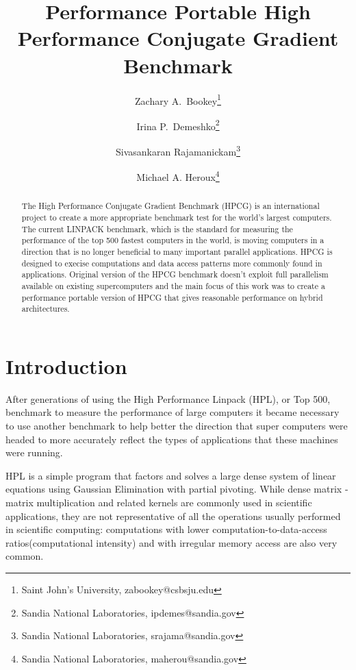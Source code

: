 \documentclass{ccr15}
\title{Performance Portable High Performance Conjugate Gradient Benchmark}
\author{Zachary A.\ Bookey\thanks{Saint John's University, zabookey@csbsju.edu} \and Irina P.\ Demeshko\thanks{Sandia National Laboratories,
ipdemes@sandia.gov} \and Sivasankaran Rajamanickam\thanks{Sandia National Laboratories, srajama@sandia.gov}\and Michael A. Heroux\thanks{Sandia National Laboratories, maherou@sandia.gov}}
\begin{document}
\maketitle
\begin{abstract}
The High Performance Conjugate Gradient Benchmark (HPCG) is an international project to create a
more appropriate benchmark test for the world's largest computers. The current LINPACK benchmark,
which is the standard for measuring the performance of the top 500 fastest computers in the
world, is moving computers in a direction that is no longer beneficial to many important
parallel applications. HPCG is designed to execise computations and data access patterns more commonly found in applications.
Original version  of  the HPCG benchmark doesn't exploit full parallelism available on existing supercomputers and the main focus of this work 
was to create a performance portable version of HPCG that gives reasonable performance on hybrid architectures.

\end{abstract}

\section{Introduction}

After generations of using the High Performance Linpack (HPL), or Top 500, benchmark \cite{ZAB:Top500} to measure the
performance of large computers it became necessary to use another benchmark to help better the
direction that super computers were headed to more accurately reflect the types of applications
that these machines were running.

HPL is a simple program that factors and solves a large dense system of linear equations using
Gaussian Elimination with partial pivoting.
While dense matrix - matrix multiplication and related kernels are commonly used in scientific applications,
they are not representative of all the operations usually performed in scientific computing:
computations with lower computation-to-data-access ratios(computational intensity) and with
irregular memory access are also very common.
\end{document}
